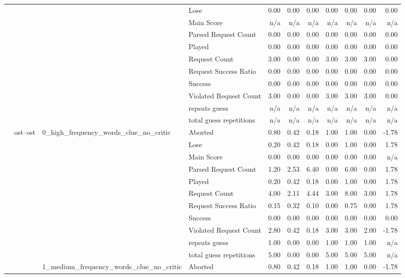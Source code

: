 \begin{tabular}{llllrrrrrrr}
 &  &  & Lose & 0.00 & 0.00 & 0.00 & 0.00 & 0.00 & 0.00 & 0.00 \\
 &  &  & Main Score & n/a & n/a & n/a & n/a & n/a & n/a & n/a \\
 &  &  & Parsed Request Count & 0.00 & 0.00 & 0.00 & 0.00 & 0.00 & 0.00 & 0.00 \\
 &  &  & Played & 0.00 & 0.00 & 0.00 & 0.00 & 0.00 & 0.00 & 0.00 \\
 &  &  & Request Count & 3.00 & 0.00 & 0.00 & 3.00 & 3.00 & 3.00 & 0.00 \\
 &  &  & Request Success Ratio & 0.00 & 0.00 & 0.00 & 0.00 & 0.00 & 0.00 & 0.00 \\
 &  &  & Success & 0.00 & 0.00 & 0.00 & 0.00 & 0.00 & 0.00 & 0.00 \\
 &  &  & Violated Request Count & 3.00 & 0.00 & 0.00 & 3.00 & 3.00 & 3.00 & 0.00 \\
 &  &  & repeats guess & n/a & n/a & n/a & n/a & n/a & n/a & n/a \\
 &  &  & total guess repetitions & n/a & n/a & n/a & n/a & n/a & n/a & n/a \\
\cline{2-11} \cline{3-11}
 & \multirow[t]{33}{*}{ost--ost} & \multirow[t]{11}{*}{0_high_frequency_words_clue_no_critic} & Aborted & 0.80 & 0.42 & 0.18 & 1.00 & 1.00 & 0.00 & -1.78 \\
 &  &  & Lose & 0.20 & 0.42 & 0.18 & 0.00 & 1.00 & 0.00 & 1.78 \\
 &  &  & Main Score & 0.00 & 0.00 & 0.00 & 0.00 & 0.00 & 0.00 & n/a \\
 &  &  & Parsed Request Count & 1.20 & 2.53 & 6.40 & 0.00 & 6.00 & 0.00 & 1.78 \\
 &  &  & Played & 0.20 & 0.42 & 0.18 & 0.00 & 1.00 & 0.00 & 1.78 \\
 &  &  & Request Count & 4.00 & 2.11 & 4.44 & 3.00 & 8.00 & 3.00 & 1.78 \\
 &  &  & Request Success Ratio & 0.15 & 0.32 & 0.10 & 0.00 & 0.75 & 0.00 & 1.78 \\
 &  &  & Success & 0.00 & 0.00 & 0.00 & 0.00 & 0.00 & 0.00 & 0.00 \\
 &  &  & Violated Request Count & 2.80 & 0.42 & 0.18 & 3.00 & 3.00 & 2.00 & -1.78 \\
 &  &  & repeats guess & 1.00 & 0.00 & 0.00 & 1.00 & 1.00 & 1.00 & n/a \\
 &  &  & total guess repetitions & 5.00 & 0.00 & 0.00 & 5.00 & 5.00 & 5.00 & n/a \\
\cline{3-11}
 &  & \multirow[t]{11}{*}{1_medium_frequency_words_clue_no_critic} & Aborted & 0.80 & 0.42 & 0.18 & 1.00 & 1.00 & 0.00 & -1.78 \\

\end{tabular}
